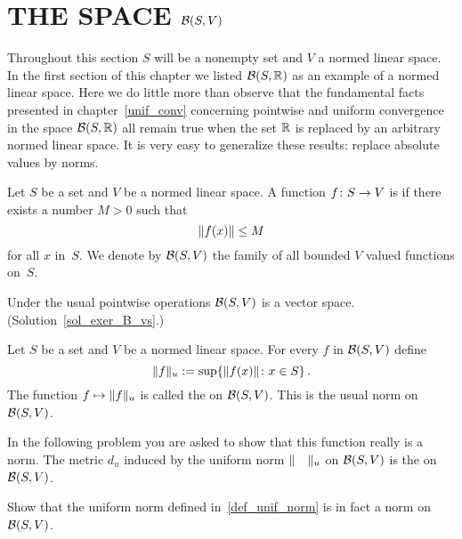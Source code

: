 \section{THE SPACE $\mathcal{B}(S,V)$}\label{space_bdd}
Throughout this section $S$ will be a nonempty set and $V$ a normed linear space. In the first
section of this chapter we listed $\mathcal{B}(S,\mathbb{R})$ as an example of a normed linear space.  Here
we do little more than observe that the fundamental facts presented in chapter~\ref{unif_conv}
concerning pointwise and uniform convergence in the space $\mathcal{B}(S,\mathbb{R})$ all remain true when
the set $\mathbb{R}$ is replaced by an arbitrary normed linear space.  It is very easy to generalize
these results: replace absolute values by norms.

\begin{defn}  Let $S$ be a set and $V$ be a normed linear space. A function $f \colon S \rightarrow V$ is
 if there exists a number $M > 0$
such that
  \[ \lVert f(x)\rVert \le M \]
for all $x$ in~$S$.  We denote by
$\mathcal{B}(S,V)$ the family of all bounded $V$ valued functions on~$S$.
\end{defn}

\begin{exer}\label{exer_B_vs}  Under the usual pointwise operations $\mathcal{B}(S,V)$ is a vector
space.  (Solution~\ref{sol_exer_B_vs}.)
\end{exer}

\begin{defn}\label{def_unif_norm}  Let $S$ be a set and $V$ be a normed linear space.  For every
$f$ in $\mathcal{B}(S,V)$ define
  \[ \lVert f\rVert_u := \sup\{\lVert f(x)\rVert \colon x \in S\}\,. \]
The function $f \mapsto \lVert f\rVert_u$ is called the
 on $\mathcal{B}(S,V)$.  This is the
usual norm on $\mathcal{B}(S,V)$.

In the following problem you are asked to show that this function really is a norm.  The
metric $d_u$ induced by the uniform norm $\lVert\quad\rVert_u$ on $\mathcal{B}(S,V)$ is the
 on~$\mathcal{B}(S,V)$.
\end{defn}

\begin{prob} Show that the uniform norm defined in~\ref{def_unif_norm} is in fact a norm
on~$\mathcal{B}(S,V)$.
\end{prob}

